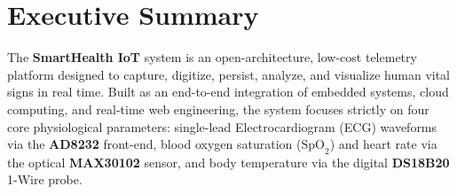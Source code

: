 \documentclass[12pt]{article}
\begin{document}
\begingroup
{}
\setlength{\parskip}{0pt}
\makeatletter
\renewcommand{\l@section}[2]{%
  \ifnum \c@tocdepth >\z@
    \addpenalty\@secpenalty
    \addvspace{5pt}%
    \setlength\@tempdima{1.5em}%
    \begingroup
      \parindent \z@ \rightskip \@pnumwidth
      \parfillskip -\@pnumwidth
      \leavevmode \bfseries
      \advance\leftskip\@tempdima
      \hskip -\leftskip
      #1\nobreak\hfil \nobreak\hb@xt@\@pnumwidth{\hss #2}\par
    \endgroup
  \fi}
\renewcommand{\l@subsection}[2]{%
  \ifnum \c@tocdepth >\@ne
    \addpenalty\@secpenalty
    \addvspace{1.5pt}%
    \setlength\@tempdima{2.3em}%
    \begingroup
      \parindent \z@ \rightskip \@pnumwidth
      \parfillskip -\@pnumwidth
      \leavevmode
      \advance\leftskip\@tempdima
      \hskip -\leftskip
      #1\nobreak\hfil \nobreak\hb@xt@\@pnumwidth{\hss #2}\par
    \endgroup
  \fi}
\makeatother
\tableofcontents
\endgroup
\clearpage

\section*{Executive Summary}

The \textbf{SmartHealth IoT} system is an open-architecture, low-cost telemetry platform designed to capture, digitize, persist, analyze, and visualize human vital signs in real time. Built as an end-to-end integration of embedded systems, cloud computing, and real-time web engineering, the system focuses strictly on four core physiological parameters: single-lead Electrocardiogram (ECG) waveforms via the \textbf{AD8232} front-end, blood oxygen saturation ($\text{SpO}_2$) and heart rate via the optical \textbf{MAX30102} sensor, and body temperature via the digital \textbf{DS18B20} 1-Wire probe.
\end{document}
